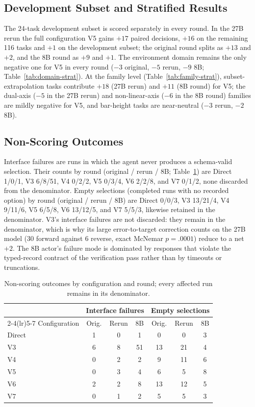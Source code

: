 \subsection{Development Subset and Stratified Results}
The 24-task development subset is scored separately in
every round.
In the 27B rerun the full configuration V5 gains $+17$ paired decisions, $+16$ on the remaining
116 tasks and $+1$ on the development subset; the
original round splits as $+13$ and $+2$, and the 8B
round as $+9$ and $+1$.
The environment domain remains the only negative one
for V5 in every round ($-3$ original, $-5$ rerun, $-9$
8B; Table~\ref{tab:domain-strat}).
At the family level (Table~\ref{tab:family-strat}),
subset-extrapolation tasks contribute $+18$ (27B rerun)
and $+11$ (8B round) for V5; the dual-axis ($-5$ in the
27B rerun) and non-linear-axis ($-6$ in the 8B round)
families are mildly negative for V5, and bar-height
tasks are near-neutral ($-3$ rerun, $-2$ 8B).

\subsection{Non-Scoring Outcomes}
Interface failures are runs in which the agent never
produces a schema-valid selection.
Their counts by round (original / rerun / 8B;
Table~\ref{tab:nonscoring}) are Direct 1/0/1, V3 6/8/51, V4 0/2/2, V5 0/3/4, V6 2/2/8, and V7 0/1/2, none discarded from the denominator. Empty selections (completed runs with no recorded option) by round (original / rerun / 8B) are Direct 0/0/3, V3 13/21/4, V4 9/11/6, V5 6/5/8, V6 13/12/5, and V7 5/5/3, likewise retained in the denominator.
V3's interface failures are not discarded: they remain
in the denominator, which is why its large
error-to-target correction counts on the 27B model
(30 forward against 6 reverse, exact McNemar
$p=.0001$) reduce to a net $+2$.
The 8B actor's failure mode is dominated by responses
that violate the typed-record contract of the
verification pass rather than by timeouts or
truncations.

\begin{table}[t]
\centering
\small
\setlength{\tabcolsep}{3pt}
\begin{tabular}{lcccccc}
\toprule
 & \multicolumn{3}{c}{Interface failures} & \multicolumn{3}{c}{Empty selections} \\
\cmidrule(lr){2-4}\cmidrule(lr){5-7}
Configuration & Orig. & Rerun & 8B & Orig. & Rerun & 8B \\
\midrule
Direct & 1 & 0 & 1 & 0 & 0 & 3 \\
V3 & 6 & 8 & 51 & 13 & 21 & 4 \\
V4 & 0 & 2 & 2 & 9 & 11 & 6 \\
V5 & 0 & 3 & 4 & 6 & 5 & 8 \\
V6 & 2 & 2 & 8 & 13 & 12 & 5 \\
V7 & 0 & 1 & 2 & 5 & 5 & 3 \\
\bottomrule
\end{tabular}
\caption{Non-scoring outcomes by configuration and
round; every affected run remains in its denominator.}
\label{tab:nonscoring}
\end{table}

